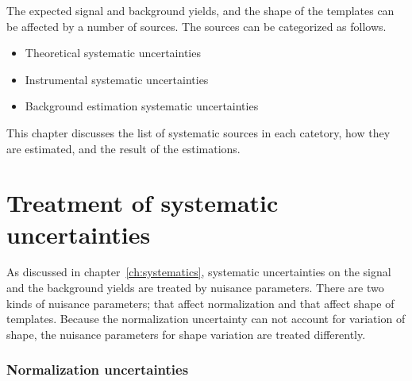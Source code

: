 
The expected signal and background yields, 
and the shape of the templates can be affected by a number of sources. 
The sources can be categorized as follows. 
\begin{itemize} 
\item Theoretical systematic uncertainties  
\item Instrumental systematic uncertainties  
\item Background estimation systematic uncertainties  
\end{itemize}  
This chapter discusses the list of systematic sources in each catetory, 
how they are estimated, and the result of the estimations. 


\section{Treatment of systematic uncertainties}

As discussed in chapter~\ref{ch:systematics}, systematic uncertainties 
on the signal and the background yields are treated by nuisance parameters. 
There are two kinds of nuisance parameters; that affect normalization and 
that affect shape of templates. Because the normalization uncertainty can not account 
for variation of shape, the nuisance parameters for shape variation are 
treated differently. 

\subsubsection{Normalization uncertainties}

